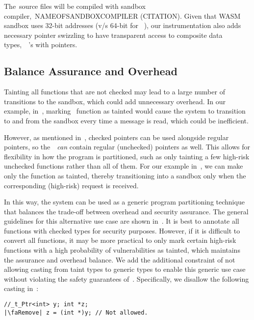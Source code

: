 The~\ucregion source files will be compiled with sandbox compiler,~\ie NAMEOFSANDBOXCOMPILER (CITATION).
Given that WASM sandbox uses 32-bit addresses (v/s 64-bit for~
\cregion), our instrumentation also adds necessary pointer swizzling to have transparent access to composite data types,~\ie~'s with pointers. 

\subsection{Balance Assurance and Overhead}
\label{subsec:otherusecases}


Tainting all functions that are not checked may lead to a large number of transitions to the sandbox, which could add unnecessary overhead. In our example, in~, marking~ function as tainted would cause the system to transition to and from the sandbox every time a message is read, which could be inefficient. 

However, as mentioned in~, checked pointers can be used alongside regular pointers, so the~\cregion{}~\emph{can} contain regular (unchecked) pointers as well.
This allows for flexibility in how the program is partitioned, such as only tainting a few high-risk unchecked functions rather than all of them. 
For our example in~, we can make only the function  as tainted, thereby transitioning into a sandbox only when the corresponding (high-risk) request is received.


In this way, the system can be used as a generic program partitioning technique that balances the trade-off between overhead and security assurance.
The general guidelines for this alternative use case are shown in~.
It is best to annotate all functions with checked types for security purposes. However, if it is difficult to convert all functions, it may be more practical to only mark certain high-risk functions with a high probability of vulnerabilities as tainted,
which maintains the assurance and overhead balance.
We add the additional constraint of not allowing casting from taint types to generic types to enable this generic use case without violating the safety guarantees of~\systemname.
Specifically, we disallow the following casting in~\cregion:
\begin{verbatim}
//_t_Ptr<int> y; int *z;
|\faRemove| z = (int *)y; // Not allowed.
\end{verbatim}
\iffalse

